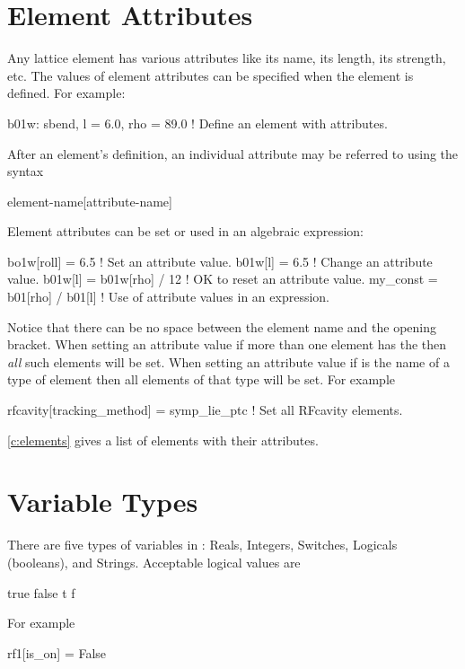 \section{Element Attributes}

Any lattice element has various attributes like its name, its length,
its strength, etc. The values of element attributes can be specified
when the element is defined. For example:
\begin{example}
  b01w: sbend, l = 6.0, rho = 89.0 ! Define an element with attributes.
\end{example}
After an element's definition, an individual attribute may be referred
to using the syntax
\begin{example}
  element-name[attribute-name]
\end{example}
Element attributes can be set or used in an algebraic expression:
\begin{example}
  bo1w[roll] = 6.5                  ! Set an attribute value.
  b01w[l] = 6.5                     ! Change an attribute value.
  b01w[l] = b01w[rho] / 12          ! OK to reset an attribute value.
  my_const = b01[rho] / b01[l]      ! Use of attribute values in an expression.
\end{example}
Notice that there can be no space between the element name and the
\vn{[} opening bracket.  When setting an attribute value if more than
one element has the  then {\it all} such elements
will be set.  When setting an attribute value if  is
the name of a type of element then all elements of that type will be
set. For example
\begin{example}
  rfcavity[tracking_method] = symp_lie_ptc ! Set all RFcavity elements.
\end{example}

\cref{c:elements} gives a list of elements with their attributes.

\section{Variable Types}
\label{s:var_types}

There are five types of variables in \bmad: Reals, Integers, Switches,
Logicals (booleans), and Strings. Acceptable logical values are
\begin{example}
   true    false
   t       f
\end{example}
For example
\begin{example}
  rf1[is_on] = False
\end{example}

